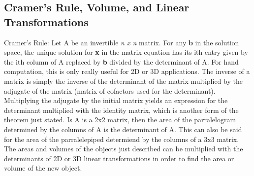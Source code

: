 \documentclass[12pt]{article}
\begin{document}
\subsection{Cramer's Rule, Volume, and Linear Transformations}
Cramer's Rule:
\newline
Let A be an invertible \textit{n x n} matrix. For any \textbf{b} in the solution space, the unique solution for \textbf{x} in the matrix equation has its ith entry given %
by the ith column of A replaced by \textbf{b} divided by the determinant of A. For hand computation, this is only really useful for 2D or 3D applications. The inverse of a %
matrix is simply the inverse of the determinant of the matrix multiplied by the adjugate of the matrix (matrix of cofactors used for the determinant). Multiplying the %
adjugate by the initial matrix yields an expression for the determinant multiplied with the identity matrix, which is another form of the theorem just stated. 
\newline
\newline
Is A is a 2x2 matrix, then the area of the parralelogram determined by the columns of A is the determinant of A. This can also be said for the area of the parralelepiped %
determiend by the columns of a 3x3 matrix. The areas and volumes of the objects just described can be multiplied with the determinants of 2D or 3D linear transformations %
in order to find the area or volume of the new object. 
\end{document}
